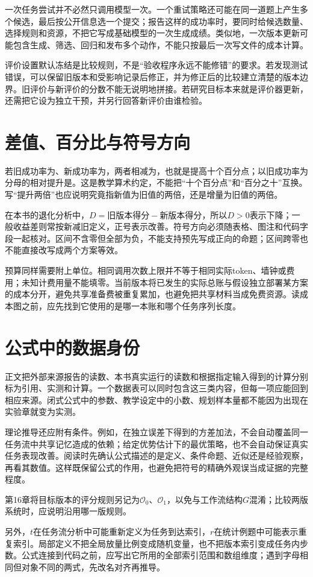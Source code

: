 一次任务尝试并不必然只调用模型一次。一个重试策略还可能在同一道题上产生多个候选，最后按公开信息选一个提交；报告这样的成功率时，要同时给候选数量、选择规则和资源，不把它写成基础模型的一次生成成绩。类似地，一次版本更新可能包含生成、筛选、回归和发布多个动作，不能只按最后一次写文件的成本计算。

评价设置默认冻结是比较规则，不是“验收程序永远不能修错”的要求。若发现测试错误，可以保留旧版本和受影响记录后修正，并为修正后的比较建立清楚的版本边界。旧评价与新评价的分数不能无说明地拼接。若研究目标本来就是评价器更新，还需把它设为独立干预，并另行回答新评价由谁检验。

\section*{差值、百分比与符号方向}

若旧成功率为、新成功率为，两者相减为，也就是提高十个百分点；以旧成功率为分母的相对提升是。这是教学算术约定，不能把“十个百分点”和“百分之十”互换。写“提升两倍”也应说明究竟指新值为旧值的两倍，还是增量为旧值的两倍。

在本书的退化分析中，$D=\text{旧版本得分}-\text{新版本得分}$，所以$D>0$表示下降；一般收益差则常按新减旧定义，正号表示改善。符号方向必须随表格、图注和代码字段一起核对。区间不含零但全部为负，不能支持预先写成正向的命题；区间跨零也不能直接改写成两个方案等效。

预算同样需要附上单位。相同调用次数上限并不等于相同实际token、墙钟或费用；未知计费用量不能填零。当前版本将已发生的实际总账与假设独立部署某方案的成本分开，避免共享准备费被重复累加，也避免把共享材料当成免费资源。读成本图之前，应先找到它使用的是哪一本账和哪个任务序列长度。

\section*{公式中的数据身份}

正文把外部来源报告的读数、本书真实运行的读数和根据指定输入得到的计算分别标为引用、实测和计算。一个数据表可以同时包含这三类内容，但每一项应能回到相应来源。闭式公式中的参数、教学设定中的小数、规划样本量都不能因为出现在实验章就变为实测。

理论推导还应附有条件。例如，在独立误差下得到的方差加法，不会自动覆盖同一任务流中共享记忆造成的依赖；给定优势估计下的最优策略，也不会自动保证真实任务表现改善。阅读时先确认公式描述的是定义、条件命题、近似还是经验观察，再看其数值。这样既保留公式的作用，也避免把符号的精确外观误当成证据的完整程度。

第16章将目标版本的评分规则另记为$\mathcal O_0$、$\mathcal O_1$，以免与工作流结构$G$混淆；比较两版系统时，应说明沿用哪一版规则。

另外，$t$在任务流分析中可能重新定义为任务到达索引，$r$在统计例题中可能表示重复索引。局部定义不把全局放量比例变成随机变量，也不把版本索引变成任务内步数。公式连接到代码之前，应写出它所用的全部索引范围和数组维度；遇到字母相同但对象不同的两式，先改名对齐再推导。
